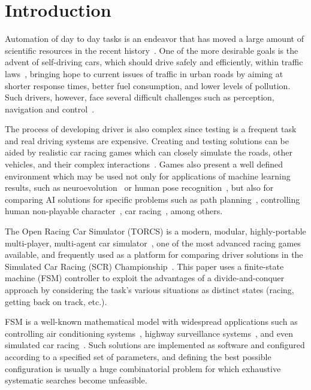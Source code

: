 \section{Introduction}\label{sec:1}

Automation of day to day tasks is an endeavor that has moved a large amount of scientific resources in the recent history~\cite{INDUS,APPLI}. One of the more desirable goals is the advent of self-driving cars, which should drive safely and efficiently, within traffic laws~\cite{SAFE,AUTOM}, bringing hope to current issues of traffic in urban roads by aiming at shorter response times, better fuel consumption, and lower levels of pollution. Such drivers, however, face several difficult challenges such as perception, navigation and control~\cite{6179503}.

The process of developing driver is also complex since testing is a frequent task and real driving systems are expensive. Creating and testing solutions can be aided by realistic car racing games which can closely simulate the roads, other vehicles, and their complex interactions~\cite{caldeira2013torcs}. Games also present a well defined environment which may be used not only for applications of machine learning results, such as neuroevolution~\cite{stanley_real-time_2005,5482132} or human pose recognition~\cite{Shotton:2011}, but also for comparing AI solutions for specific problems such as path planning~\cite{deFreitas:2012}, controlling human non-playable character~\cite{simon2008}, car racing~\cite{2009}, among others.

The Open Racing Car Simulator (TORCS) is a modern, modular, highly-portable multi-player, multi-agent car simulator~\cite{SIMUTORCS}, one of the most advanced racing games available, and frequently used as a platform for comparing driver solutions in the Simulated Car Racing (SCR) Championship~\cite{2009,Loiacono:2012:LEA:2212908.2212953}. This paper uses a finite-state machine (FSM) controller to exploit the advantages of a divide-and-conquer approach by considering the task's various situations as distinct states (racing, getting back on track, etc.).

FSM is a well-known mathematical model with widespread applications such as controlling air conditioning systems~\cite{BERNARD}, highway surveillance systems~\cite{DOHYUN}, and even simulated car racing~\cite{DIEGO}. Such solutions are implemented as software and configured according to a specified set of parameters, and defining the best possible configuration is usually a huge combinatorial problem for which exhaustive systematic searches become unfeasible.


